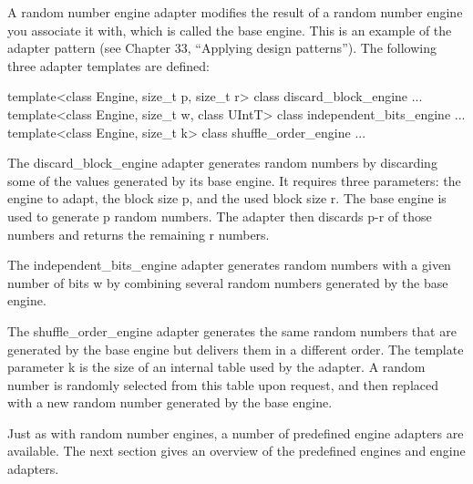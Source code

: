 A random number engine adapter modifies the result of a random number engine you associate it with, which is called the base engine. This is an example of the adapter pattern (see Chapter 33, “Applying design patterns”). The following three adapter templates are defined:

\begin{cpp}
template<class Engine, size_t p, size_t r> class discard_block_engine {...}
template<class Engine, size_t w, class UIntT> class independent_bits_engine {...}
template<class Engine, size_t k> class shuffle_order_engine {...}
\end{cpp}

The discard\_block\_engine adapter generates random numbers by discarding some of the values generated by its base engine. It requires three parameters: the engine to adapt, the block size p, and the used block size r. The base engine is used to generate p random numbers. The adapter then discards p-r of those numbers and returns the remaining r numbers.

The independent\_bits\_engine adapter generates random numbers with a given number of bits w by combining several random numbers generated by the base engine.

The shuffle\_order\_engine adapter generates the same random numbers that are generated by the base engine but delivers them in a different order. The template parameter k is the size of an internal table used by the adapter. A random number is randomly selected from this table upon request, and then replaced with a new random number generated by the base engine.

Just as with random number engines, a number of predefined engine adapters are available. The next section gives an overview of the predefined engines and engine adapters.


























